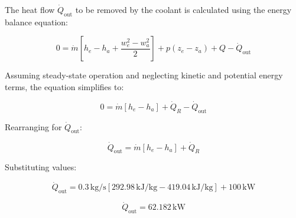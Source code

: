 The heat flow \( \dot{Q}_{\text{out}} \) to be removed by the coolant is calculated using the energy balance equation:  

\[
0 = \dot{m} \left[ h_e - h_a + \frac{w_e^2 - w_a^2}{2} \right] + p \left( z_e - z_a \right) + Q - \dot{Q}_{\text{out}}
\]

Assuming steady-state operation and neglecting kinetic and potential energy terms, the equation simplifies to:  

\[
0 = \dot{m} \left[ h_e - h_a \right] + \dot{Q}_R - \dot{Q}_{\text{out}}
\]

Rearranging for \( \dot{Q}_{\text{out}} \):  

\[
\dot{Q}_{\text{out}} = \dot{m} \left[ h_e - h_a \right] + \dot{Q}_R
\]

Substituting values:  

\[
\dot{Q}_{\text{out}} = 0.3 \, \text{kg/s} \left[ 292.98 \, \text{kJ/kg} - 419.04 \, \text{kJ/kg} \right] + 100 \, \text{kW}
\]

\[
\dot{Q}_{\text{out}} = 62.182 \, \text{kW}
\]